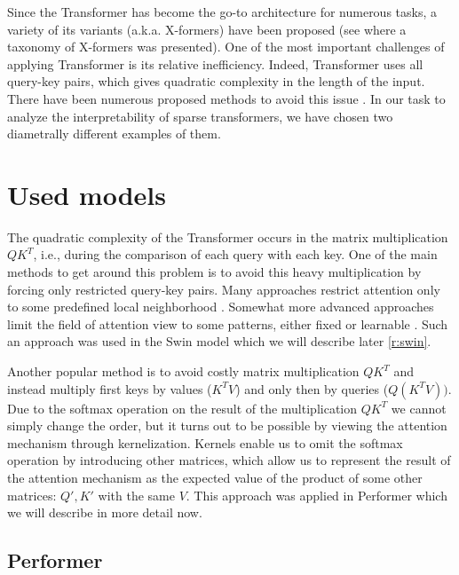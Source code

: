\documentclass[magisterska,en]{pracamgr}
\begin{document}
Since the Transformer has become the go-to architecture for numerous tasks, a variety of its variants (a.k.a. X-formers) have been proposed (see \cite{DBLP:journals/corr/abs-2106-04554} where a taxonomy of X-formers was presented). One of the most important challenges of applying Transformer is its relative inefficiency. Indeed, Transformer uses all query-key pairs, which gives quadratic complexity in the length of the input. There have been numerous proposed methods to avoid this issue \cite{DBLP:journals/csur/TayDBM23}. In our task to analyze the interpretability of sparse transformers, we have chosen two diametrally different examples of them.








\chapter{Used models}\label{r:sparse_transformers}

The quadratic complexity of the Transformer occurs in the matrix multiplication $QK^T$, i.e., during the comparison of each query with each key. One of the main methods to get around this problem is to avoid this heavy multiplication by forcing only restricted query-key pairs. Many approaches restrict attention only to some predefined local neighborhood \cite{DBLP:conf/icml/ParmarVUKSKT18}. Somewhat more advanced approaches limit the field of attention view to some patterns, either fixed or learnable \cite{DBLP:journals/csur/TayDBM23}. Such an approach was used in the Swin model \cite{DBLP:conf/iccv/LiuL00W0LG21} which we will describe later \ref{r:swin}.

Another popular method is to avoid costly matrix multiplication $QK^T$ and instead multiply first keys by values ($K^TV$) and only then by queries ($Q(K^TV))$. Due to the softmax operation on the result of the multiplication $QK^T$ we cannot simply change the order, but it turns out to be possible by viewing the attention mechanism through kernelization. Kernels enable us to omit the softmax operation by introducing other matrices, which allow us to represent the result of the attention mechanism as the expected value of the product of some other matrices: $Q', K'$ with the same $V$. This approach was applied in Performer \cite{DBLP:conf/iclr/ChoromanskiLDSG21} which we will describe in more detail now.


\section{Performer}\label{r:performer}
\end{document}
